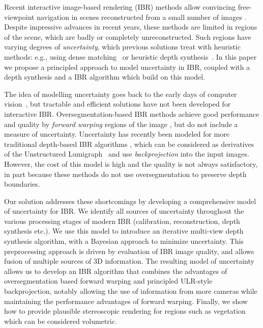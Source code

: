 
Recent interactive image-based rendering (IBR) methods allow convincing free-viewpoint navigation
in scenes reconstructed from a small number of images \cite{Eisemann08FT,dibr,chaurasia13,ODD15}.
Despite impressive advances in recent years, these methods are limited in
regions of the scene, which are badly or completely unreconstructed.
Such regions have varying degrees of \emph{uncertainty}, which 
previous solutions treat with heuristic methods: e.g., using dense matching~\cite{dibr}
or heuristic depth synthesis~\cite{chaurasia13}. 
In this paper we propose a principled approach to model uncertainty in IBR, coupled
with a depth synthesis and a IBR algorithm which build on this model.

The idea of modelling uncertainty goes back to the early days of
computer vision~\cite{Szeliski}, but tractable and efficient solutions
have not been developed for interactive IBR. Oversegmentation-based IBR methods achieve
good performance and quality by \emph{forward warping} regions of the image \cite{Zitnick:2004:viewinterp,chaurasia13},
but do not include a measure of uncertainty. Uncertainty has recently
been modeled for more traditional depth-based IBR algorithms \cite{devernay},
which can be considered as derivatives of the Unstructured Lumigraph~\cite{ULR} and use
\emph{backprojection} into the input images. However, the cost of this model is high
and the quality is not always satisfactory, in part because these methods do not use
oversegmentation to preserve depth boundaries.

Our solution addresses these shortcomings by developing a comprehensive model
of uncertainty for IBR. We identify all sources of uncertainty throughout the various processing
stages of modern IBR (calibration, reconstruction, depth synthesis etc.).
We use this model to introduce an iterative multi-view depth synthesis algorithm,
with a Bayesian approach to minimize uncertainty. This preprocessing approach is driven by evaluation of
IBR image quality, and allows fusion of multiple sources of 3D information.
The resulting model of uncertainty 
allows us to develop an IBR algorithm that combines the advantages of  
oversegmentation based forward warping and principled ULR-style backprojection,
notably allowing the use of information from more cameras while maintaining the performance
advantages of forward warping. Finally, we show how to provide plausible 
stereoscopic rendering for regions such as vegetation which can be considered volumetric.


